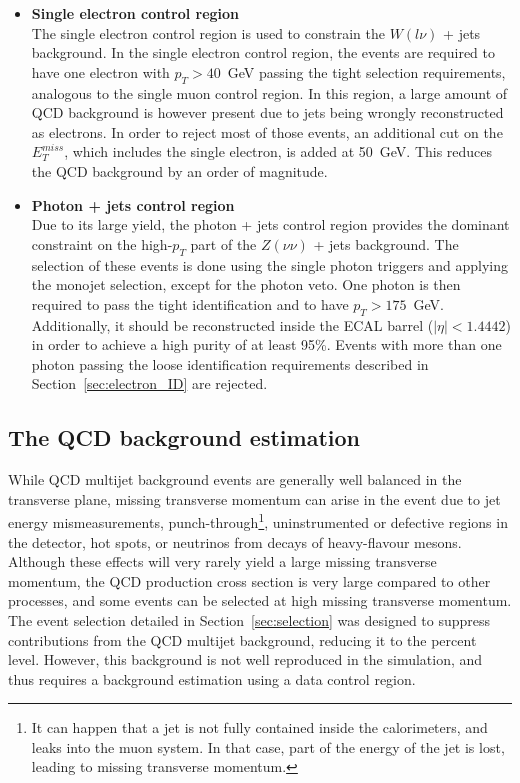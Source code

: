 \begin{itemize}
\item[] \textbf{Single electron control region}\\ The single electron control region is used to constrain the $W(l\nu)$ + jets background. In the single electron control region, the events are required to have one electron with $p_T > 40$~GeV passing the tight selection requirements, analogous to the single muon control region. In this region, a large amount of QCD background is however present due to jets being wrongly reconstructed as electrons. In order to reject most of those events, an additional cut on the $E_T^{miss}$, which includes the single electron, is added at 50~GeV. This reduces the QCD background by an order of magnitude.

\item[] \textbf{Photon + jets control region}\\Due to its large yield, the photon + jets control region provides the dominant constraint on the high-$p_T$ part of the $Z(\nu\nu)$ + jets background. The selection of these events is done using the single photon triggers and applying the monojet selection, except for the photon veto. One photon is then required to pass the tight identification and to have $p_T > 175$~GeV. Additionally, it should be reconstructed inside the \ac{ECAL} barrel ($|\eta| < 1.4442$) in order to achieve a high purity of at least 95\%. Events with more than one photon passing the loose identification requirements described in Section~\ref{sec:electron_ID} are rejected.
\end{itemize}

\subsection{The QCD background estimation}

While QCD multijet background events are generally well balanced in the transverse plane, missing transverse momentum can arise in the event due to jet energy mismeasurements, punch-through\footnote{It can happen that a jet is not fully contained inside the calorimeters, and leaks into the muon system. In that case, part of the energy of the jet is lost, leading to missing transverse momentum.}, uninstrumented or defective regions in the detector, hot spots, or neutrinos from decays of heavy-flavour mesons. Although these effects will very rarely yield a large missing transverse momentum, the QCD production cross section is very large compared to other processes, and some events can be selected at high missing transverse momentum. The event selection detailed in Section~\ref{sec:selection} was designed to suppress contributions from the QCD multijet background, reducing it to the percent level. However, this background is not well reproduced in the simulation, and thus requires a background estimation using a data control region.

